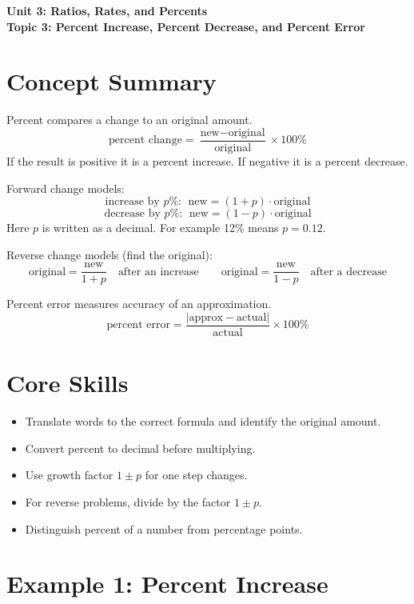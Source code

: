 \documentclass[14pt]{extarticle}
\begin{document}
\raggedright
{}

\begin{center}
    \LARGE \textbf{Unit 3: Ratios, Rates, and Percents} \\[6pt]
    \Large \textbf{Topic 3: Percent Increase, Percent Decrease, and Percent Error}
\end{center}

\vspace{1em}

\section*{Concept Summary}

Percent compares a change to an original amount.  
\[
\text{percent change}=\frac{\text{new} - \text{original}}{\text{original}}\times 100\%
\]
If the result is positive it is a percent increase. If negative it is a percent decrease.

Forward change models:
\[
\text{increase by }p\%:\ \ \text{new}=(1+p)\cdot \text{original}
\]
\[
\text{decrease by }p\%:\ \ \text{new}=(1-p)\cdot \text{original}
\]
Here \(p\) is written as a decimal. For example 12\% means \(p=0.12\).

Reverse change models (find the original):
\[
\text{original}=\frac{\text{new}}{1+p}\quad \text{after an increase}
\qquad
\text{original}=\frac{\text{new}}{1-p}\quad \text{after a decrease}
\]

Percent error measures accuracy of an approximation.
\[
\text{percent error}=\frac{|\text{approx} - \text{actual}|}{\text{actual}}\times 100\%
\]

\section*{Core Skills}
\begin{itemize}
  \item Translate words to the correct formula and identify the original amount.
  \item Convert percent to decimal before multiplying.
  \item Use growth factor \(1\pm p\) for one step changes.
  \item For reverse problems, divide by the factor \(1\pm p\).
  \item Distinguish percent of a number from percentage points.
\end{itemize}

\section*{Example 1: Percent Increase}
\end{document}
